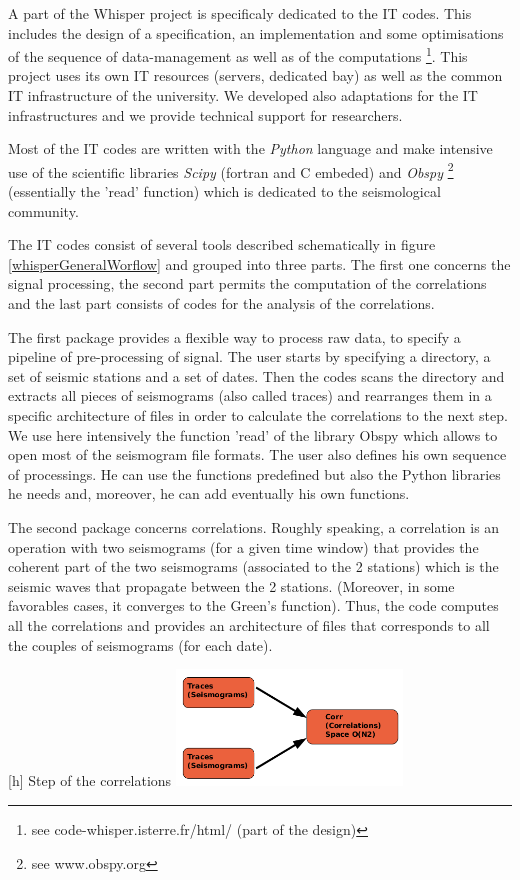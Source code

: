 \documentclass[a4paper, 10pt]{article}
\begin{document}
\begin{multicols}{2}
A part of the Whisper project is specificaly dedicated to the IT codes. This includes the design of a specification, an implementation and some optimisations of the sequence of data-management as well as of the computations \footnote{see code-whisper.isterre.fr/html/ (part of the design)}.
This project uses its own IT resources (servers, dedicated bay) as well as the common IT infrastructure of the university.
We developed also adaptations for the IT infrastructures and we provide technical support for researchers.

Most of the IT codes are written with the \emph{Python} language and make intensive use of the scientific libraries \emph{Scipy} (fortran and C embeded) 
and \emph{Obspy} \footnote{ see www.obspy.org} (essentially the 'read' function) which is dedicated to the seismological community. 

The IT codes consist of several tools described schematically in figure \ref{whisperGeneralWorflow} and grouped into three parts. The first one concerns the signal processing, the second part permits the computation of the correlations and the last part consists of codes for the analysis of the correlations.

The first package provides a flexible way to process raw data, to specify a pipeline of pre-processing of signal.
The user starts by specifying a directory, a set of seismic stations and a set of dates. Then the codes scans the directory
and extracts all pieces of seismograms (also called traces) and rearranges them in a specific architecture of files in order to calculate the correlations to the next step.
We use here intensively the function 'read' of the library Obspy which allows to open most of the seismogram file formats.
The user also defines his own sequence of processings. He can use the functions predefined but also the Python libraries he needs and,
moreover, he can add eventually his own functions.

The second package concerns correlations. 
Roughly speaking, a correlation is an operation with two seismograms (for a given time window) that provides the coherent part of the two seismograms 
(associated to the 2 stations) which is the seismic waves that propagate between the 2 stations.
(Moreover, in some favorables cases, it converges to the Green's function). 
Thus, the code computes all the correlations and provides an architecture of files that corresponds to all the couples of seismograms (for each date). 

\begin{center}
\centering
{}[h]{\label{whisperCorrelationStep} Step of the correlations}
\includegraphics[width=6cm]{schemaCorrelationStep.png}
\end{center}


\end{multicols}
\end{document}
